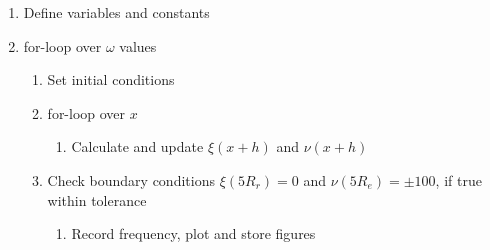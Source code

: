 \documentclass[x11names]{article}
\begin{document}
    \begin{enumerate}
      \item Define variables and constants
      \item for-loop over \(\omega\) values
        \begin{enumerate}
          \item Set initial conditions
          \item for-loop over \(x\)
            \begin{enumerate}
              \item Calculate and update $\xi(x + h)$ and $\nu(x + h)$
            \end{enumerate}
          \item Check boundary conditions \(\xi(5R_r) = 0\) and $\nu(5R_e) = \pm 100$, if true within tolerance
            \begin{enumerate}
              \item Record frequency, plot and store figures
            \end{enumerate}
        \end{enumerate}
    \end{enumerate}
\end{document}
